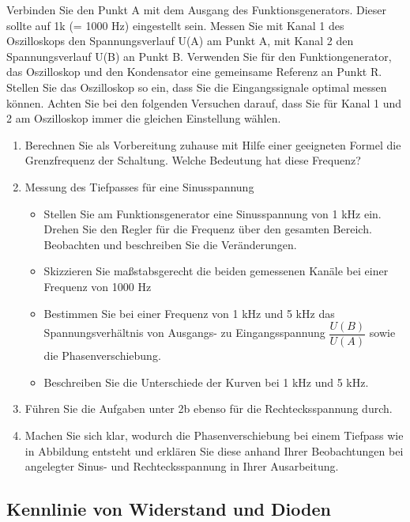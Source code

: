 \documentclass[paper=a4, fontsize=11pt]{scrartcl}
\numberwithin{equation}{section}
\numberwithin{figure}{section}
\numberwithin{table}{section}
\begin{document}
Verbinden Sie den Punkt A mit dem Ausgang des Funktionsgenerators. Dieser sollte auf 1k (= 1000 Hz) eingestellt sein. Messen Sie mit Kanal 1 des Oszilloskops den Spannungsverlauf U(A) am Punkt A, mit Kanal 2 den Spannungsverlauf U(B) an Punkt B. Verwenden Sie für den Funktiongenerator, das Oszilloskop und den Kondensator eine gemeinsame Referenz an Punkt R. Stellen Sie das Oszilloskop so ein, dass Sie die Eingangssignale optimal messen können. Achten Sie bei den folgenden Versuchen darauf, dass Sie für Kanal 1 und 2 am Oszilloskop immer die gleichen Einstellung wählen. \\

\begin{enumerate}
\item Berechnen Sie als Vorbereitung zuhause mit Hilfe einer geeigneten Formel die Grenzfrequenz der Schaltung. Welche Bedeutung hat diese Frequenz?
\item Messung des Tiefpasses für eine Sinusspannung
\begin{itemize}
\item Stellen Sie am Funktionsgenerator eine Sinusspannung von 1 kHz ein. Drehen Sie den Regler für die Frequenz über den gesamten Bereich. Beobachten und beschreiben Sie die Veränderungen.
\item Skizzieren Sie maßstabsgerecht die beiden gemessenen Kanäle bei einer Frequenz von 1000 Hz
\item Bestimmen Sie bei einer Frequenz von 1 kHz und 5 kHz das Spannungsverhältnis von Ausgangs- zu Eingangsspannung $\dfrac{U(B)}{U(A)}$ sowie die Phasenverschiebung.
\item Beschreiben Sie die Unterschiede der Kurven bei 1 kHz und 5 kHz.
\end{itemize}
\item Führen Sie die Aufgaben unter 2b ebenso für die Rechtecksspannung durch.
\item Machen Sie sich klar, wodurch die Phasenverschiebung bei einem Tiefpass wie in Abbildung entsteht und erklären Sie diese anhand Ihrer Beobachtungen bei angelegter Sinus- und Rechtecksspannung in Ihrer Ausarbeitung.
\end{enumerate}

\subsection{Kennlinie von Widerstand und Dioden}

\end{document}

